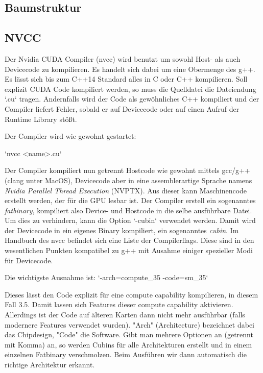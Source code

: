 			\subsection{Baumstruktur}
			\subsection{NVCC}
			Der Nvidia CUDA Compiler (\gls{nvcc}) wird benutzt um sowohl Host- als auch Devicecode zu kompilieren. Es handelt sich dabei um eine Obermenge des g++. Es lässt sich bis zum C++14 Standard alles in C oder C++ kompilieren. Soll explizit CUDA Code kompiliert werden, so muss die Quelldatei die Dateiendung \li`.cu` tragen. Andernfalls wird der Code als gewöhnliches C++ kompiliert und der Compiler liefert Fehler, sobald er auf Devicecode oder auf einen Aufruf der Runtime Library stößt.
		
			Der Compiler wird wie gewohnt gestartet:
		
			\li`nvcc <name>.cu`
		
			Der Compiler kompiliert nun getrennt Hostcode wie gewohnt mittels gcc/g++ (clang unter MacOS), Devicecode aber in eine assemblerartige Sprache namens \textit{Nvidia Parallel Thread Execution} (\Gls{NVPTX}). Aus dieser kann Maschinencode erstellt werden, der für die GPU lesbar ist. Der Compiler erstell ein sogenanntes \textit{fatbinary}, kompiliert also Device- und Hostcode in die selbe ausführbare Datei. Um dies zu verhindern, kann die Option \li`-cubin` verwendet werden. Damit wird der Devicecode in ein eigenes Binary kompiliert, ein sogenanntes \textit{cubin}. Im Handbuch des \gls{nvcc} \autocite{cudaNVCC} befindet sich eine Liste der Compilerflags. Diese sind in den wesentlichen Punkten kompatibel zu g++ mit Ausahme einiger spezieller Modi für Devicecode.
		
			Die wichtigste Ausnahme ist: \li`-arch=compute_35 -code=sm_35`
		
			Dieses lässt den Code explizit für eine \gls{compute capability} kompilieren, in diesem Fall 3.5. Damit lassen sich Features dieser \gls{compute capability} aktivieren. Allerdings ist der Code auf älteren Karten dann nicht mehr ausführbar (falls modernere Features verwendet wurden). "Arch" (Architecture) bezeichnet dabei das Chipdesign, "Code" die Software. Gibt man mehrere Optionen an (getrennt mit Komma) an, so werden Cubins für alle Architekturen erstellt und in einem einzelnen Fatbinary verschmolzen. Beim Ausführen wir dann automatisch die richtige Architektur erkannt.
		
